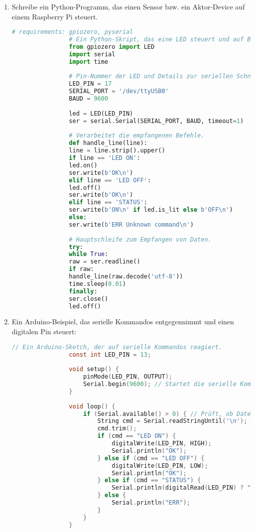 \documentclass[11pt,a4paper,oneside]{article}
\newcounter{loesung}[section]
\renewcommand{\theloesung}{\thesection.\arabic{loesung}}
\newenvironment{loesung}[1]{%
	\refstepcounter{loesung}%
	\begin{tcolorbox}[termbase,
		colframe=loesungColor!50!black,
		boxed title style={interior style={left color=loesungColor, right color=loesungColor!70!black}},
		title={Lösung~\theloesung: #1}]%
	}{\end{tcolorbox}}
\begin{document}
	
	\begin{loesung}{Steuerung eines Mikroprozessors mit der seriellen Schnittstelle}
		\begin{enumerate}
			\item Schreibe ein Python-Programm, das einen Sensor bzw. ein Aktor-Device auf einem Raspberry Pi steuert.
			
			\begin{lstlisting}[language=Python, caption={Raspberry Pi: LED-Steuerung + serielle Steuerung (pySerial + gpiozero)}]
				# requirements: gpiozero, pyserial
				# Ein Python-Skript, das eine LED steuert und auf Befehle über die serielle Schnittstelle hört.
				from gpiozero import LED
				import serial
				import time
				
				# Pin-Nummer der LED und Details zur seriellen Schnittstelle.
				LED_PIN = 17
				SERIAL_PORT = '/dev/ttyUSB0'
				BAUD = 9600
				
				led = LED(LED_PIN)
				ser = serial.Serial(SERIAL_PORT, BAUD, timeout=1)
				
				# Verarbeitet die empfangenen Befehle.
				def handle_line(line):
				line = line.strip().upper()
				if line == 'LED ON':
				led.on()
				ser.write(b'OK\n')
				elif line == 'LED OFF':
				led.off()
				ser.write(b'OK\n')
				elif line == 'STATUS':
				ser.write(b'ON\n' if led.is_lit else b'OFF\n')
				else:
				ser.write(b'ERR Unknown command\n')
				
				# Hauptschleife zum Empfangen von Daten.
				try:
				while True:
				raw = ser.readline()
				if raw:
				handle_line(raw.decode('utf-8'))
				time.sleep(0.01)
				finally:
				ser.close()
				led.off()
			\end{lstlisting}
			
			
			\item Ein Arduino-Beispiel, das serielle Kommandos entgegennimmt und einen digitalen Pin steuert:
			\begin{lstlisting}[language=C, caption={Arduino: Serial command handler}]
				// Ein Arduino-Sketch, der auf serielle Kommandos reagiert.
				const int LED_PIN = 13;
				
				void setup() {
					pinMode(LED_PIN, OUTPUT);
					Serial.begin(9600); // Startet die serielle Kommunikation.
				}
				
				void loop() {
					if (Serial.available() > 0) { // Prüft, ob Daten verfügbar sind.
						String cmd = Serial.readStringUntil('\n'); // Liest eine Zeile.
						cmd.trim();
						if (cmd == "LED ON") {
							digitalWrite(LED_PIN, HIGH);
							Serial.println("OK");
						} else if (cmd == "LED OFF") {
							digitalWrite(LED_PIN, LOW);
							Serial.println("OK");
						} else if (cmd == "STATUS") {
							Serial.println(digitalRead(LED_PIN) ? "ON" : "OFF");
						} else {
							Serial.println("ERR");
						}
					}
				}
			\end{lstlisting}
			

\end{enumerate}
\end{loesung}
\end{document}
